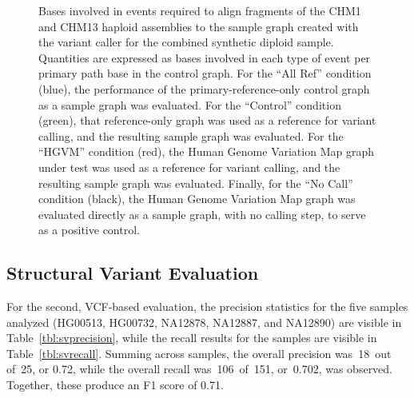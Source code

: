 \begin{figure}[p]
\caption[Mole realignment evaluation]{Bases involved in events required to align fragments of the CHM1 and CHM13 haploid assemblies to the sample graph created with the \vg variant caller for the combined synthetic diploid sample. Quantities are expressed as bases involved in each type of event per primary path base in the control graph. For the ``All Ref'' condition (blue), the performance of the primary-reference-only control graph as a sample graph was evaluated. For the ``Control'' condition (green), that reference-only graph was used as a reference for variant calling, and the resulting sample graph was evaluated. For the ``HGVM'' condition (red), the Human Genome Variation Map graph under test was used as a reference for variant calling, and the resulting sample graph was evaluated. Finally, for the ``No Call'' condition (black), the Human Genome Variation Map graph was evaluated directly as a sample graph, with no calling step, to serve as a positive control.}
\label{fig:molerealignment}
\end{figure}

\subsection{Structural Variant Evaluation}

For the second, VCF-based evaluation, the precision statistics for the five samples analyzed (HG00513, HG00732, NA12878, NA12887, and NA12890) are visible in Table~\ref{tbl:svprecision}, while the recall results for the samples are visible in Table~\ref{tbl:svrecall}.
Summing across samples, the overall precision was~18~out of~25, or 0.72, while the overall recall was~106~of~151, or~0.702, was observed. Together, these produce an F1 score of 0.71.

\newcommand{\true}{\textbullet}
\newcommand{\false}{}


